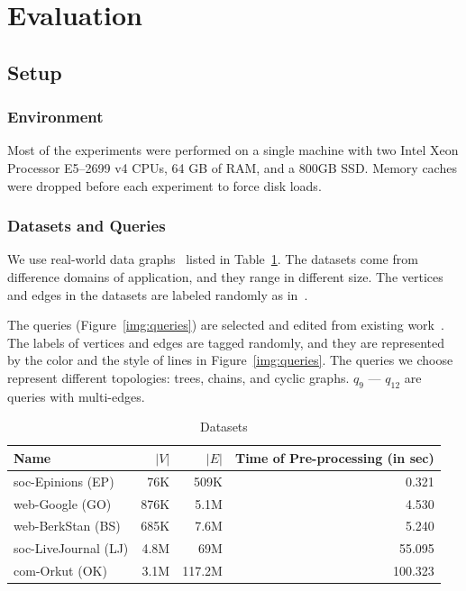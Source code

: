 \section{Evaluation}\label{sec:experiments}
\subsection{Setup}
\subsubsection{Environment}
Most of the experiments were performed on a single machine with two Intel Xeon Processor E5--2699 v4 CPUs, 64 GB of RAM,
and a 800GB SSD\@.
Memory caches were dropped before each experiment to force disk loads.
\subsubsection{Datasets and Queries}
We use real-world data graphs~\cite{snapnets} listed in Table~\ref{tab:datasets}.
The datasets come from difference domains of application, and they range in different size.
The vertices and edges in the datasets are labeled randomly as in~\cite{DBLP:journals/pvldb/MhedhbiS19}.

The queries (Figure~\ref{img:queries}) are selected and edited from existing work~\cite{DBLP:conf/cloud/SerafiniMS17,DBLP:journals/pvldb/MhedhbiS19}.
The labels of vertices and edges are tagged randomly,
and they are represented by the color and the style of lines in Figure~\ref{img:queries}.
The queries we choose represent different topologies: trees, chains, and cyclic graphs.
$q_9$ --- $q_{12}$ are queries with multi-edges.
\begin{table}
  \caption{Datasets}\label{tab:datasets}
  \begin{tabular}{lrrr}
    \toprule
    Name & $|V|$ & $|E|$ & \parbox[t][][t]{0.18\linewidth}{Time of Pre-processing (in sec)} \\
    \midrule
    soc-Epinions (EP) & 76K & 509K & 0.321 \\
    web-Google (GO) & 876K & 5.1M & 4.530 \\
    web-BerkStan (BS) & 685K & 7.6M & 5.240 \\
    soc-LiveJournal (LJ) & 4.8M & 69M & 55.095 \\
    com-Orkut (OK) & 3.1M & 117.2M & 100.323 \\
    \bottomrule
  \end{tabular}
\end{table}

